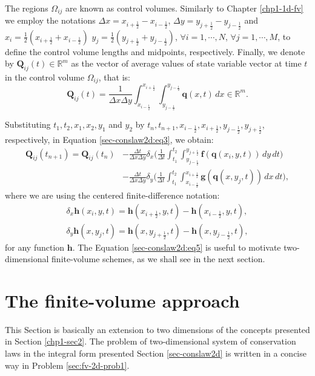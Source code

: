The regions $\Omega_{ij}$ are known as control volumes. 
Similarly to  Chapter \ref{chp1-1d-fv} we employ the notations
$\Delta x = x_{i+\frac{1}{2}} - x_{i-\frac{1}{2}}$,
$\Delta y = y_{j+\frac{1}{2}} - y_{j-\frac{1}{2}}$ 
and $x_i = \frac{1}{2}(x_{i+\frac{1}{2}} + x_{i-\frac{1}{2}})$
$y_j = \frac{1}{2}(y_{j+\frac{1}{2}} + y_{j-\frac{1}{2}})$, $\forall i = 1, \cdots, N$, 
$\forall j = 1, \cdots, M$,
to define the control volume lengths and midpoints, respectively.
Finally, we denote by $\mathbf{Q}_{ij}(t) \in \mathbb{R}^m$ as the vector of 
average values of state variable vector at time $t$
in the control volume $\Omega_{ij}$, that is:
\begin{equation}
	\label{sec-conslaw2d:eq4}
	\mathbf{Q}_{ij}(t) = \frac{1}{\Delta x \Delta y}
	\int_{x_{i-\frac{1}{2}}}^{x_{i+\frac{1}{2}}} \int_{y_{j-\frac{1}{2}}}^{y_{j-\frac{1}{2}}} \mathbf{q}(x,t) \,dx
	\in \mathbb{R}^m.
\end{equation}

Substituting $t_1, t_2, x_1, x_2, y_1$ and $y_2$ by 
$t_{n}, t_{n+1}, x_{i-\frac{1}{2}}, x_{i+\frac{1}{2}}, y_{j-\frac{1}{2}}, y_{j+\frac{1}{2}}$,
respectively, in Equation \eqref{sec-conslaw2d:eq3}, we obtain:
\begin{align}
	\label{sec-conslaw2d:eq5}
	\mathbf{Q}_{ij}(t_{n+1})  = \mathbf{Q}_{ij}(t_{n})
	&- \frac{\Delta t}{\Delta x \Delta y}
	\delta _x \bigg( \frac{1}{\Delta t}
	\int_{t_1}^{t_2} \int_{y_{j-\frac{1}{2}}}^{y_{j+\frac{1}{2}}} 
	\mathbf{f}(\mathbf{q}(x_{i}, y, t))
	\,dy \,dt \bigg) \\ \nonumber
	&- \frac{\Delta t}{\Delta x \Delta y}
	\delta _y \bigg( \frac{1}{\Delta t}
	\int_{t_1}^{t_2} \int_{x_{i-\frac{1}{2}}}^{x_{i+\frac{1}{2}}} 
	\mathbf{g}(\mathbf{q}(x, y_{j}, t))
	\,dx \,dt \bigg),
\end{align}
where we are using the centered finite-difference notation:
\begin{align}
	\label{sec-conslaw2d:eq6}
	\delta_x \mathbf{h}(x_i,y, t) = 
	\mathbf{h}(x_{i+\frac{1}{2}}, y, t) - 
	\mathbf{h}(x_{i-\frac{1}{2}}, y, t), \\
	\delta_y \mathbf{h}(x, y_j,t) = 
    \mathbf{h}(x, y_{j+\frac{1}{2}},t) - 
    \mathbf{h}(x, y_{j-\frac{1}{2}},t),
\end{align}
for any function $\mathbf{h}$. The Equation \eqref{sec-conslaw2d:eq5} is useful to
motivate two-dimensional finite-volume schemes, as we shall see in the next section.

\section{The finite-volume approach}
\label{sec:fv-2d}
This Section is basically an extension to two dimensions 
of the concepts presented in Section \ref{chp1-sec2}.
The problem of two-dimensional system of conservation laws in the integral form 
presented Section \ref{sec-conslaw2d} is written in a concise way in Problem \ref{sec:fv-2d-prob1}.

